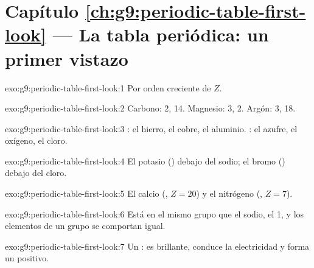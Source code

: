 \section*{Capítulo \ref{ch:g9:periodic-table-first-look} --- La tabla periódica: un primer vistazo}

\begin{solution}{exo:g9:periodic-table-first-look:1}
Por orden creciente de  $Z$.
\end{solution}

\begin{solution}{exo:g9:periodic-table-first-look:2}
Carbono:  2,  14. Magnesio:  3,  2. Argón:
 3,  18.
\end{solution}

\begin{solution}{exo:g9:periodic-table-first-look:3}
: el hierro, el cobre, el aluminio. : el azufre, el
oxígeno, el cloro.
\end{solution}

\begin{solution}{exo:g9:periodic-table-first-look:4}
El potasio () debajo del sodio; el bromo () debajo del
cloro.
\end{solution}

\begin{solution}{exo:g9:periodic-table-first-look:5}
El calcio (, $Z = 20$) y el nitrógeno (, $Z = 7$).
\end{solution}

\begin{solution}{exo:g9:periodic-table-first-look:6}
Está en el mismo grupo que el sodio, el  1, y los elementos de un
grupo se comportan igual.
\end{solution}

\begin{solution}{exo:g9:periodic-table-first-look:7}
Un : es brillante, conduce la electricidad y forma un  positivo.
\end{solution}

